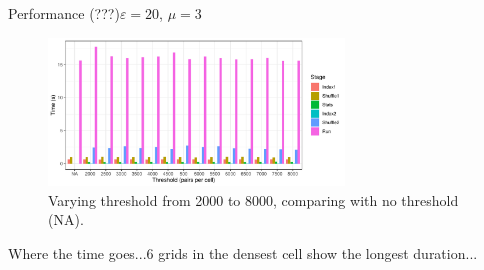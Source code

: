 \documentclass{beamer}
\begin{document}
\begin{frame}{Performance (???)}{$\varepsilon=20$, $\mu=3$}
        \centering
        \begin{figure}
                \includegraphics[width=0.7\textwidth]{figures/Density/densityByStage}
                \caption{Varying threshold from 2000 to 8000, comparing with no threshold (NA).}
        \end{figure}
\end{frame}

\begin{frame}{Where the time goes...}{6 grids in the densest cell show the longest duration...}
        \centering
\end{frame}
\end{document}
